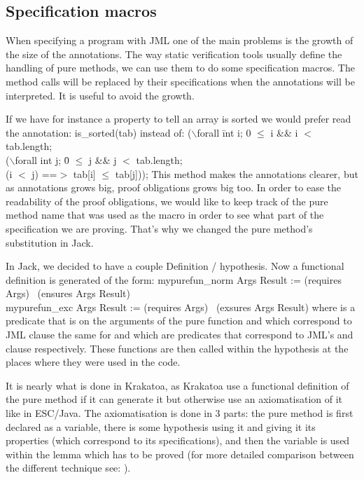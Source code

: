 \subsection{Specification macros}


When specifying a program with JML one of the main problems is the 
growth of the size of the annotations. 
The way static verification tools usually define the handling 
of pure methods, we can use them to do some specification macros.
The method calls will be replaced by their specifications when the 
annotations will be interpreted. It is useful to avoid the growth.

If we have for instance a property to tell an array is sorted we would 
prefer read the annotation:
\btab is\_sorted(tab)\etab
instead of:
\btab
 ($\backslash$forall \=int i; 0 $\le$ i \&\& i $<$ tab.length;\+\\ 
 ($\backslash$forall int j; \=0 $\le$ j \&\& j $<$ tab.length; \+\\
(i $<$ j) ==$>$ tab[i] $\le$ tab[j]));
\etab
This method makes the annotations clearer, but as annotations 
grows big, proof obligations grows big too. In order to ease the readability 
of the proof obligations, we would like to keep track of the pure method name
that was used as the macro in order to see what part of the specification we 
are proving. That's why we changed the pure method's substitution in Jack.

In Jack, we decided to have a couple Definition / hypothesis.
Now a functional definition is generated of the form:
\btab
mypurefun\_norm  Args Result := (requires Args) \rarrow 
\ (ensures Args Result)\\
mypurefun\_exc  Args Result := (requires Args) \rarrow 
\ (exsures Args Result) \etab
where  is a predicate that is on the arguments of 
the pure function and which correspond to JML  
clause the same for  and  
which are predicates that correspond to JML's  and 
 clause respectively.
These functions are then called within the hypothesis at the places 
where they were used in the code. 

It is nearly what is done in Krakatoa\cite{MPMU-04-JLAP}, as
Krakatoa use a functional definition of the pure method if it can generate it
but otherwise use an axiomatisation of it like in ESC/Java\cite{COKK-04-ESCJ}.
The axiomatisation is done in 3 parts: the pure method is first declared 
as a variable, there is some hypothesis  using it and giving 
it its properties (which correspond to its specifications), 
and then the variable is used within the lemma which has to be 
proved (for more detailed comparison between 
the different technique see: \cite{COK-04-METH,DarvasMueller-05}).

